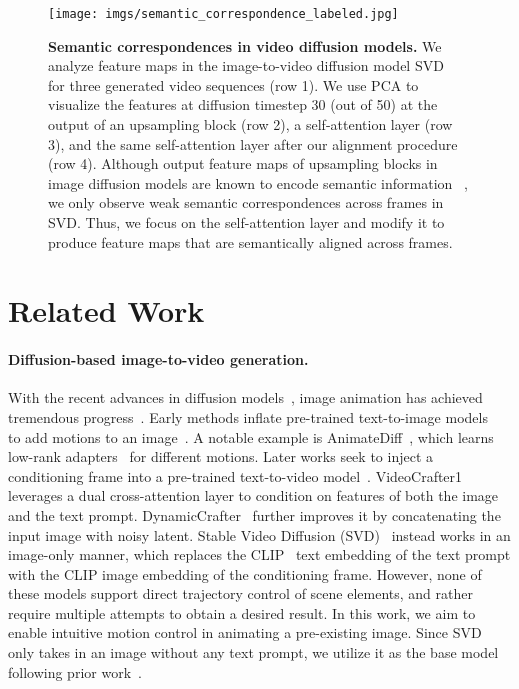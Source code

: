 \documentclass{article} \usepackage{iclr2025_conference,times}
\begin{document}
\begin{figure}[!t]
\centering
\texttt{[image: imgs/semantic\_correspondence\_labeled.jpg]}
\caption{\textbf{Semantic correspondences in video diffusion models.}
We analyze feature maps in the image-to-video diffusion model SVD~\citep{blattmann2023stable} for three generated video sequences (row 1). 
We use PCA to visualize the features at diffusion timestep 30 (out of 50) at the output of an upsampling block (row 2), a self-attention layer (row 3), and the same self-attention layer after our alignment procedure (row 4). Although output feature maps of upsampling blocks in image diffusion models are known to encode semantic information ~\citep{tang2023emergent}, we only observe weak semantic correspondences across frames in SVD. 
Thus, we focus on the self-attention layer and modify it to produce feature maps that are semantically aligned across frames.
}
\label{fig:correspondence}
\vspace{-2.0mm}
\end{figure}
 

 \section{Related Work}
\label{sec:related}

\paragraph{Diffusion-based image-to-video generation.}
With the recent advances in diffusion models~\citep{DiffusionModels,DDPM}, image animation has achieved tremendous progress~\citep{wang2023videocomposer,VideoCrafter1,VideoCrafter2,AnimateDiff}.
Early methods inflate pre-trained text-to-image models~\citep{LatentDiffusion} to add motions to an image~\citep{Tune-a-video,Text2VideoZero,Make-A-Video}.
A notable example is AnimateDiff~\citep{AnimateDiff}, which learns low-rank adapters~\citep{LoRA}  for different motions.
Later works seek to inject a conditioning frame into a pre-trained text-to-video model~\citep{VideoDiffusionModels,ImagenVideo,LVDM}.
VideoCrafter1~\citep{VideoCrafter1} leverages a dual cross-attention layer to condition on features of both the image and the text prompt.
DynamicCrafter~\citep{DynamiCrafter} further improves it by concatenating the input image with noisy latent.
Stable Video Diffusion (SVD)~\citep{blattmann2023stable} instead works in an image-only manner, which replaces the CLIP~\citep{CLIP} text embedding of the text prompt with the CLIP image embedding of the conditioning frame.
However, none of these models support direct trajectory control of scene elements, and rather require multiple attempts to obtain a desired result.
In this work, we aim to enable intuitive motion control in animating a pre-existing image.
Since SVD only takes in an image without any text prompt, we utilize it as the base model following prior work~\citep{yin2023dragnuwa,wu2024draganything}.
\end{document}
